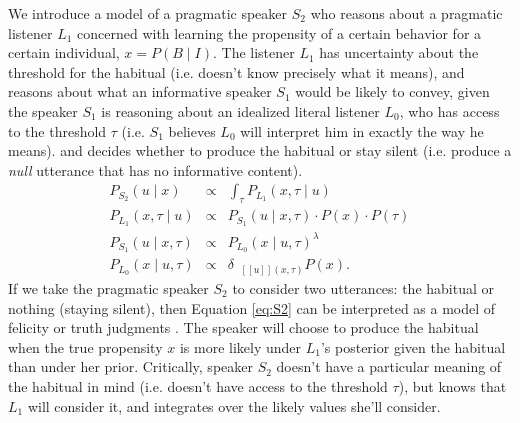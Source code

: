 \documentclass[10pt,letterpaper]{article}
\newcommand{\denote}[1]{\mbox{ $[\![ #1 ]\!]$}}
\newcommand{\ndg}[1]{\textcolor{Green}{[ndg: #1]}}
\begin{document}
We introduce a model of a pragmatic speaker $S_2$ who reasons about a pragmatic listener $L_1$ concerned with learning the propensity of a certain behavior for a certain individual, $x=P(B \mid I)$.
The listener $L_1$ has uncertainty about the threshold for the habitual (i.e. doesn't know precisely what it means), and reasons about what an informative speaker $S_1$ would be likely to convey, given the speaker $S_1$ is reasoning about an idealized literal listener $L_0$, who has access to the threshold $\tau$ (i.e. $S_1$ believes $L_0$ will interpret him in exactly the way he means). 
  and decides whether to produce the habitual or stay silent (i.e. produce a \emph{null} utterance that has no informative content).
%
\begin{eqnarray}
P_{S_{2}}(u \mid x) & \propto &  \int_{\tau} P_{L_{1}}(x , \tau \mid u) \label{eq:S2}\\
P_{L_{1}}(x , \tau \mid u) &\propto& P_{S_{1}}(u \mid x, \tau) \cdot P(x) \cdot P(\tau) \label{eq:L1}\\
P_{S_{1}}(u \mid x, \tau) &\propto&  {P_{L_{0}}(x \mid u, \tau)}^{\lambda} \label{eq:S1}\\
P_{L_{0}}(x \mid u, \tau) &\propto& {\delta_{\denote{u}(x, \tau)} P(x)}. \label{eq:L0}
\end{eqnarray}
If we take the pragmatic speaker $S_2$ to consider two utterances: the habitual or nothing (staying silent), then Equation \ref{eq:S2} can be interpreted as a model of felicity or truth judgments \cite{Degen2014, TesslerUnderReview}.
The speaker will choose to produce the habitual when the true propensity $x$ is more likely under $L_1$'s posterior given the habitual than under her prior. 
Critically, speaker $S_{2}$ doesn't have a particular meaning of the habitual in mind (i.e. doesn't have access to the threshold $\tau$), but knows that $L_{1}$ will consider it, and integrates over the likely values she'll consider.
\end{document}
